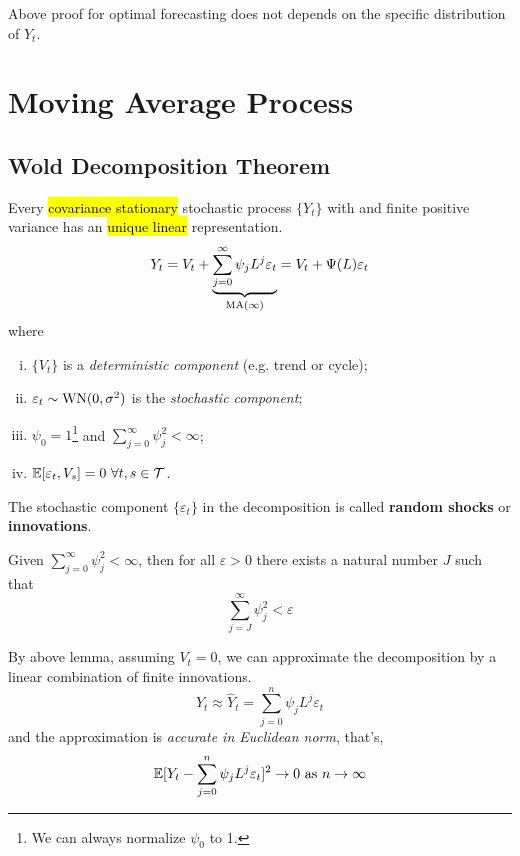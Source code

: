 \documentclass[11pt]{article}
\begin{document}
		\begin{remark}
			Above proof for optimal forecasting does not depends on the specific distribution of $Y_t$.
		\end{remark}
		
	\section{Moving Average Process}
		\subsection{Wold Decomposition Theorem}
			\begin{theorem}
				Every \hl{covariance stationary} stochastic process $\{Y_t\}$ with and finite positive variance has an \hl{unique linear} representation.
				\begin{equation}
					Y_t = V_t + \underbrace{\sum_{j=0}^\infty \psi_j L^j \varepsilon_t}_{\text{{MA($\infty$)}}} = V_t + \Psi(L)\varepsilon_t
				\end{equation}
				where 
				\begin{enumerate}[(i)]
					\item $\{V_t\}$ is a \emph{deterministic component} (e.g. trend or cycle);
					\item $\varepsilon_t \sim \text{{WN}}(0, \sigma^2)$ is the \emph{stochastic component};
					\item $\psi_0 = 1$\footnote{We can always normalize $\psi_0$ to 1.} and $\sum_{j=0}^\infty \psi_j^2 < \infty$;
					\item $\expect{\varepsilon_t, V_s} = 0\ \forall t, s \in \mc{T}$.
				\end{enumerate}
			\end{theorem}
			\begin{definition}
				The stochastic component $\{\varepsilon_t\}$ in the decomposition is called \textbf{random shocks} or \textbf{innovations}.
			\end{definition}
			
			\begin{lemma}
				Given $\sum_{j=0}^\infty \psi_j^2 < \infty$, then for all $\varepsilon > 0$ there exists a natural number $J$ such that
				\begin{equation}
					\sum_{j=J}^\infty \psi_j^2 < \varepsilon
				\end{equation}
			\end{lemma}
			
			\begin{corollary}
				By above lemma, assuming $V_t = 0$, we can approximate the decomposition by a linear combination of finite innovations.
				\begin{equation}
					Y_t \approx \hat{Y}_t = \sum_{j=0}^n \psi_j L^j \varepsilon_t
				\end{equation}
				and the approximation is \emph{accurate in Euclidean norm}, that's,
				\begin{equation}
					\mathbb{E}[{Y_t -\sum_{j=0}^n \psi_j L^j \varepsilon_t}]^2 \rightarrow 0 \text{{ as }} n \to \infty
				\end{equation}
			\end{corollary}
			
\end{document}
